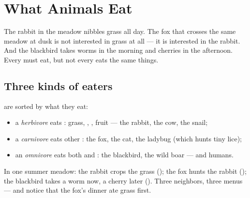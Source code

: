 \chapter{What Animals Eat}\label{ch:g2:what-animals-eat}

The rabbit in the meadow nibbles grass all day. The fox that
crosses the same meadow at dusk is not interested in grass at all
--- it is interested in the rabbit. And the blackbird takes worms
in the morning and cherries in the afternoon. Every  must
eat, but not every  eats the same things.

\section{Three kinds of eaters}

\begin{definition}\label{def:g2:what-animals-eat:kinds}
 are sorted by what they eat:
\begin{itemize}
  \item a \emph{herbivore} eats : grass,
        , , fruit --- the rabbit, the cow, the snail;
  \item a \emph{carnivore} eats other :
        the fox, the cat, the ladybug (which hunts tiny 
        lice);
  \item an \emph{omnivore} eats both  and
        : the blackbird, the wild boar --- and humans.
\end{itemize}
\end{definition}

\begin{example}\label{ex:g2:what-animals-eat:meadow}
In one summer meadow: the rabbit crops the grass (); the
fox hunts the rabbit (); the blackbird takes a worm now,
a cherry later (). Three neighbors, three menus --- and
notice that the fox's dinner ate grass first.
\end{example}

